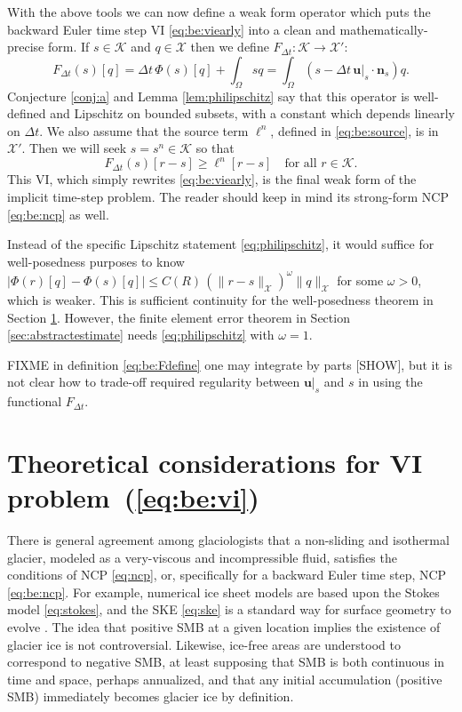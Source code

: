 \documentclass[hidelinks,onefignum,onetabnum,final]{siamart220329}  %
\newcommand{\bn}{\mathbf{n}}
\newcommand{\bu}{\mathbf{u}}
\newcommand{\cK}{\mathcal{K}}
\newcommand{\cX}{\mathcal{X}}
\begin{document}
With the above tools we can now define a weak form operator which puts the backward Euler time step VI \eqref{eq:be:viearly} into a clean and mathematically-precise form.  If $s\in\cK$ and $q\in\cX$ then we define $F_{\Delta t}:\cK\to\cX'$:
\begin{equation}
F_{\Delta t}(s)[q] = \Delta t\,\Phi(s)[q] + \int_\Omega s q = \int_\Omega \left(s - \Delta t\, \bu|_s \cdot \bn_s\right) q.  \label{eq:be:Fdefine}
\end{equation}
Conjecture \ref{conj:a} and Lemma \ref{lem:philipschitz} say that this operator is well-defined and Lipschitz on bounded subsets, with a constant which depends linearly on $\Delta t$.  We also assume that the source term $\ell^n$, defined in \eqref{eq:be:source}, is in $\cX'$.  Then we will seek $s = s^n \in \cK$ so that
\begin{equation}
F_{\Delta t}(s)[r-s] \ge \ell^n[r-s] \quad \text{for all } r \in \cK. \label{eq:be:vi}
\end{equation}
This VI, which simply rewrites \eqref{eq:be:viearly}, is the final weak form of the implicit time-step problem.  The reader should keep in mind its strong-form NCP \eqref{eq:be:ncp} as well.

Instead of the specific Lipschitz statement \eqref{eq:philipschitz}, it would suffice for well-posedness purposes to know $\Big|\Phi(r)[q] - \Phi(s)[q]\Big| \le C(R)\, (\|r-s\|_{\cX})^\omega \|q\|_{\cX}$ for some $\omega>0$, which is weaker.  This is sufficient continuity for the well-posedness theorem in Section \ref{sec:theory}.  However, the finite element error theorem in Section \ref{sec:abstractestimate} needs \eqref{eq:philipschitz} with $\omega=1$.

FIXME in definition \eqref{eq:be:Fdefine} one may integrate by parts [SHOW], but it is not clear how to trade-off required regularity between $\bu|_s$ and $s$ in using the functional $F_{\Delta t}$.


\section{Theoretical considerations for VI problem~(\ref{eq:be:vi})} \label{sec:theory}

There is general agreement among glaciologists that a non-sliding and isothermal glacier, modeled as a very-viscous and incompressible fluid, satisfies the conditions of NCP \eqref{eq:ncp}, or, specifically for a backward Euler time step, NCP \eqref{eq:be:ncp}.  For example, numerical ice sheet models \cite{IsaacStadlerGhattas2015,Pattynetal2008,WirbelJarosch2020} are based upon the Stokes model \eqref{eq:stokes}, and the SKE \eqref{eq:ske} is a standard way for surface geometry to evolve \cite{GreveBlatter2009,SchoofHewitt2013}.  The idea that positive SMB at a given location implies the existence of glacier ice is not controversial.  Likewise, ice-free areas are understood to correspond to negative SMB, at least supposing that SMB is both continuous in time and space, perhaps annualized, and that any initial accumulation (positive SMB) immediately becomes glacier ice by definition.
\end{document}

